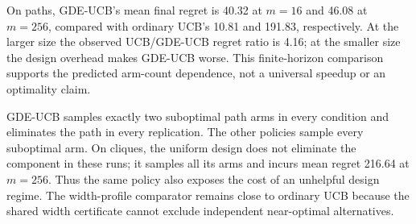 On paths, GDE-UCB's mean final regret is 40.32 at $m=16$ and 46.08 at $m=256$, compared with ordinary UCB's 10.81 and 191.83, respectively. At the larger size the observed UCB/GDE-UCB regret ratio is 4.16; at the smaller size the design overhead makes GDE-UCB worse. This finite-horizon comparison supports the predicted arm-count dependence, not a universal speedup or an optimality claim.

GDE-UCB samples exactly two suboptimal path arms in every condition and eliminates the path in every replication. The other policies sample every suboptimal arm. On cliques, the uniform design does not eliminate the component in these runs; it samples all its arms and incurs mean regret 216.64 at $m=256$. Thus the same policy also exposes the cost of an unhelpful design regime. The width-profile comparator remains close to ordinary UCB because the shared width certificate cannot exclude independent near-optimal alternatives.
